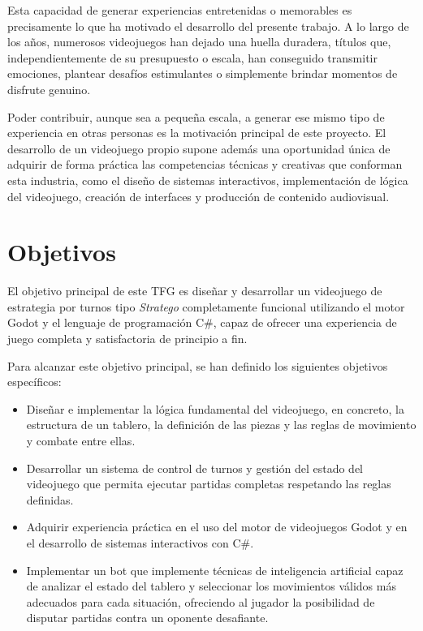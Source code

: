 Esta capacidad de generar experiencias entretenidas o memorables es precisamente lo que ha motivado el desarrollo del presente trabajo. A lo largo de los años, numerosos videojuegos han dejado una huella duradera, títulos que, independientemente de su presupuesto o escala, han conseguido transmitir emociones, plantear desafíos estimulantes o simplemente brindar momentos de disfrute genuino.

Poder contribuir, aunque sea a pequeña escala, a generar ese mismo tipo de experiencia en otras personas es la motivación principal de este proyecto. El desarrollo de un videojuego propio supone además una oportunidad única de adquirir de forma práctica las competencias técnicas y creativas que conforman esta industria, como el diseño de sistemas interactivos, implementación de lógica del videojuego, creación de interfaces y producción de contenido audiovisual.

\section{Objetivos}

El objetivo principal de este TFG es diseñar y desarrollar un videojuego de estrategia por turnos tipo \textit{Stratego} completamente funcional utilizando el motor Godot y el lenguaje de programación C\#, capaz de ofrecer una experiencia de juego completa y satisfactoria de principio a fin.

Para alcanzar este objetivo principal, se han definido los siguientes objetivos específicos:

\begin{itemize}
	
	\item Diseñar e implementar la lógica fundamental del videojuego, en concreto, la estructura de un tablero, la definición de las piezas y las reglas de movimiento y combate entre ellas.
	
	\item Desarrollar un sistema de control de turnos y gestión del estado del videojuego que permita ejecutar partidas completas respetando las reglas definidas.
	
	\item Adquirir experiencia práctica en el uso del motor de videojuegos Godot y en el desarrollo de sistemas interactivos con C\#.
	
	\item Implementar un bot que implemente técnicas de inteligencia artificial capaz de analizar el estado del tablero y seleccionar los movimientos válidos más adecuados para cada situación, ofreciendo al jugador la posibilidad de disputar partidas contra un oponente desafiante.
	
\end{itemize}

